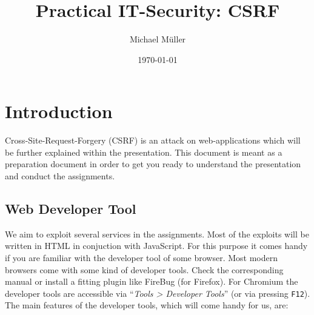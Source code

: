 \documentclass{report}
\title{Practical IT-Security: CSRF}
\author{Michael Müller}
\date{\today}
\begin{document}
\newpage

\maketitle

\newpage


\section{Introduction}

Cross-Site-Request-Forgery (\textsc{CSRF}) is an attack on web-applications
which will be further explained within the presentation.
This document is meant as a preparation document in order to get you ready to
understand the presentation and conduct the assignments.

\subsection{Web Developer Tool}

We aim to exploit several services in the assignments. Most of the exploits
will be written in HTML in conjuction with JavaScript. For this purpose it
comes handy if you are familiar with the developer tool of some browser.
Most modern browsers come with some kind of developer tools. Check the
corresponding manual or install a fitting plugin like FireBug (for Firefox). 
For Chromium the developer tools are accessible via ``\emph{Tools > Developer 
Tools}'' (or via pressing \texttt{F12}).
The main features of the developer tools, which will come handy for us, are: 
\end{document}
